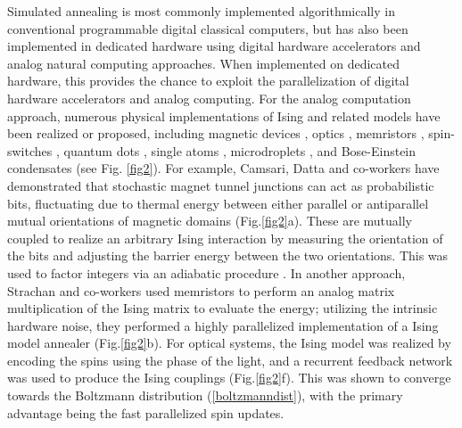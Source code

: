 \documentclass[fleqn,10pt]{wlscirep}
\def\change#1{#1}
\begin{document}
Simulated annealing is most commonly implemented algorithmically in conventional programmable digital classical computers, but has also been implemented in dedicated hardware using digital hardware accelerators and analog natural computing approaches.   
When implemented on dedicated hardware, this provides the chance to exploit the parallelization of digital hardware accelerators and analog computing. For the analog computation approach, numerous physical implementations of Ising and related models have been realized or proposed, including \change{magnetic devices  \cite{camsari2017stochastic,camsari2019p,borders2019integer,sutton2017intrinsic,shim2017ising,arnalds2016new,bhanja2016non,lee2021thermodynamic,mizushima2017large}}, optics \cite{pierangeli2019large,pierangeli2020adiabatic,roques2020heuristic}, memristors \cite{cai2020power,bojnordi2016memristive}, spin-switches \cite{behin2016building}, quantum dots \cite{sarkar2005synthesizing}, single atoms \cite{kiraly2021atomic}, microdroplets \cite{guo2021molecular}, and Bose-Einstein condensates \cite{byrnes2011accelerated,byrnes2013neural} (see Fig. \ref{fig2}).  For example, Camsari, Datta and co-workers have demonstrated that stochastic magnet tunnel junctions can act as probabilistic bits, fluctuating due to thermal energy between either parallel or antiparallel mutual orientations of magnetic domains \cite{camsari2017stochastic,camsari2019p,sutton2017intrinsic} (Fig.\ref{fig2}a).  These are mutually coupled to realize an arbitrary Ising interaction by measuring the orientation of the bits and adjusting the barrier energy between the two orientations.  This was used to factor integers via an adiabatic procedure \cite{borders2019integer}. In another approach, Strachan and co-workers used memristors to perform an analog matrix multiplication of the Ising matrix to evaluate the energy; utilizing the intrinsic hardware noise, they performed a highly parallelized implementation of a Ising model annealer  \cite{cai2020power} (Fig.\ref{fig2}b). For optical systems, the Ising model was realized by encoding the spins using the phase of the light, and a recurrent feedback network was used to produce the Ising couplings \cite{pierangeli2019large,pierangeli2020adiabatic,roques2020heuristic} (Fig.\ref{fig2}f). This was shown to converge towards the Boltzmann distribution (\ref{boltzmanndist}), with the primary advantage being the fast parallelized spin updates. 
\end{document}
